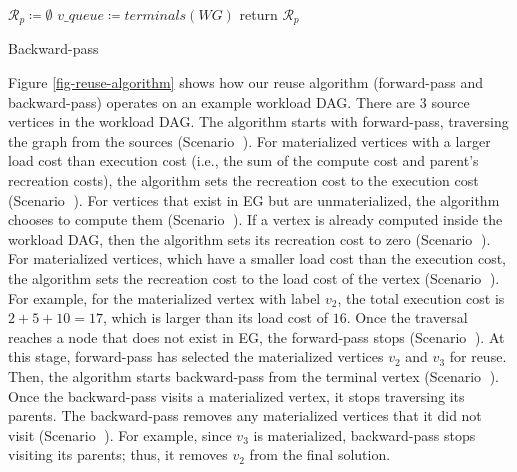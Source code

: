 \begin{algorithm}[h]
$\mathcal{R}_p \coloneqq \emptyset$\;
$v\_queue \coloneqq terminals(WG)$\;
return $\mathcal{R}_p$\;
\caption{Backward-pass}\label{backward-pass}
\end{algorithm}

Figure \ref{fig-reuse-algorithm} shows how our reuse algorithm (forward-pass and backward-pass) operates on an example workload DAG.
There are 3 source vertices in the workload DAG.
The algorithm starts with forward-pass, traversing the graph from the sources (Scenario \textcircled{}).
For materialized vertices with a larger load cost than execution cost (i.e., the sum of the compute cost and parent's recreation costs), the algorithm sets the recreation cost to the execution cost (Scenario \textcircled{}).
For vertices that exist in EG but are unmaterialized, the algorithm chooses to compute them (Scenario \textcircled{}).
If a vertex is already computed inside the workload DAG, then the algorithm sets its recreation cost to zero (Scenario \textcircled{}).
For materialized vertices, which have a smaller load cost than the execution cost, the algorithm sets the recreation cost to the load cost of the vertex (Scenario \textcircled{}).
For example, for the materialized vertex with label $v_2$, the total execution cost is $2 + 5 + 10 = 17$, which is larger than its load cost of $16$.
Once the traversal reaches a node that does not exist in EG, the forward-pass stops (Scenario \textcircled{}).
At this stage, forward-pass has selected the materialized vertices $v_2$ and $v_3$ for reuse.
Then, the algorithm starts backward-pass from the terminal vertex (Scenario \textcircled{}).
Once the backward-pass visits a materialized vertex, it stops traversing its parents.
The backward-pass removes any materialized vertices that it did not visit (Scenario \textcircled{}).
For example, since $v_3$ is materialized, backward-pass stops visiting its parents; thus, it removes $v_2$ from the final solution.

